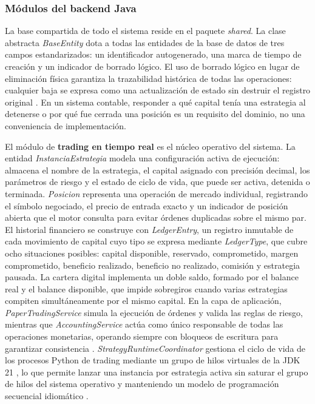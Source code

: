 \subsubsection{Módulos del backend Java}

La base compartida de todo el sistema reside en el paquete \textit{shared}. La clase abstracta \textit{BaseEntity} dota a todas las entidades de la base de datos de tres campos estandarizados: un identificador autogenerado, una marca de tiempo de creación y un indicador de borrado lógico. El uso de borrado lógico en lugar de eliminación física garantiza la trazabilidad histórica de todas las operaciones: cualquier baja se expresa como una actualización de estado sin destruir el registro original \parencite{fowler_patterns_2002}. En un sistema contable, responder a qué capital tenía una estrategia al detenerse o por qué fue cerrada una posición es un requisito del dominio, no una conveniencia de implementación.

El módulo de \textbf{trading en tiempo real} es el núcleo operativo del sistema. La entidad \textit{InstanciaEstrategia} modela una configuración activa de ejecución: almacena el nombre de la estrategia, el capital asignado con precisión decimal, los parámetros de riesgo y el estado de ciclo de vida, que puede ser activa, detenida o terminada. \textit{Posicion} representa una operación de mercado individual, registrando el símbolo negociado, el precio de entrada exacto y un indicador de posición abierta que el motor consulta para evitar órdenes duplicadas sobre el mismo par. El historial financiero se construye con \textit{LedgerEntry}, un registro inmutable de cada movimiento de capital cuyo tipo se expresa mediante \textit{LedgerType}, que cubre ocho situaciones posibles: capital disponible, reservado, comprometido, margen comprometido, beneficio realizado, beneficio no realizado, comisión y estrategia pausada. La cartera digital implementa un doble saldo, formado por el balance real y el balance disponible, que impide sobregiros cuando varias estrategias compiten simultáneamente por el mismo capital. En la capa de aplicación, \textit{PaperTradingService} simula la ejecución de órdenes y valida las reglas de riesgo, mientras que \textit{AccountingService} actúa como único responsable de todas las operaciones monetarias, operando siempre con bloqueos de escritura para garantizar consistencia \parencite{goetz_java_concurrency_2006}. \textit{StrategyRuntimeCoordinator} gestiona el ciclo de vida de los procesos Python de trading mediante un grupo de hilos virtuales de la JDK 21 \parencite{goetz_jep444_2023}, lo que permite lanzar una instancia por estrategia activa sin saturar el grupo de hilos del sistema operativo y manteniendo un modelo de programación secuencial idiomático \parencite{goetz_java_concurrency_2006}.

